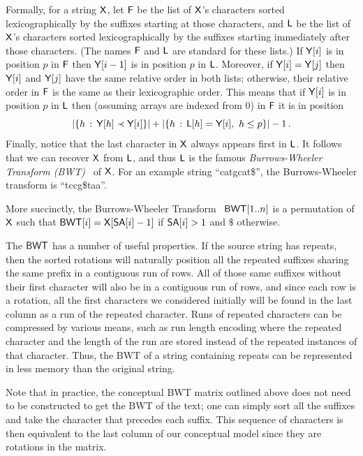 Formally, for a string $\mathsf{X}$, let $\mbox{\rm {\sf F}}$ be the list of $\mathsf{X}$'s characters sorted lexicographically by the suffixes starting at those characters, and $\mbox{\rm {\sf L}}$ be the list of $\mathsf{X}$'s characters sorted lexicographically by the suffixes starting immediately after those characters.  (The names $\mbox{\rm {\sf F}}$ and $\mbox{\rm {\sf L}}$ are standard for these lists.)  If \(\mathsf{Y} [i]\) is in position $p$ in $\mbox{\rm {\sf F}}$ then \(\mathsf{Y} [i - 1]\) is in position $p$ in $\mbox{\rm {\sf L}}$.  Moreover, if \(\mathsf{Y} [i] = \mathsf{Y} [j]\) then \(\mathsf{Y} [i]\) and \(\mathsf{Y} [j]\) have the same relative order in both lists; otherwise, their relative order in $\mbox{\rm {\sf F}}$ is the same as their lexicographic order.  This means that if \(\mathsf{Y} [i]\) is in position $p$ in $\mbox{\rm {\sf L}}$ then (assuming arrays are indexed from 0) in $\mbox{\rm {\sf F}}$ it is in position
\[|\{h\,:\,\mathsf{Y} [h] \prec \mathsf{Y}[i]\}| + |\{h\,:\, \mbox{\rm {\sf L}} [h] = \mathsf{Y} [i],\ h \leq p\}| - 1\,.\] Finally, notice that the last character in $\mathsf{X}$ always appears first in $\mbox{\rm {\sf L}}$.  It follows that we can recover $\mathsf{X}$ from $\mbox{\rm {\sf L}}$, and thus $\mbox{\rm {\sf L}}$ is the famous {\em Burrows-Wheeler Transform (BWT)}~\cite{bw1994} of $\mathsf{X}$.  For an example string ``catgcat\$'', the Burrows-Wheeler transform is ``tccg\$taa''.

More succinctly, the Burrows-Wheeler Transform~\cite{bw1994} $\mbox{\rm {\sf BWT}}[1..n]$ is a
permutation of $\mathsf{X}$ such that $\mbox{\rm {\sf BWT}}[i] = \mathsf{X}[\mbox{\rm {\sf SA}}[i]-1]$ if $\mbox{\rm {\sf SA}}[i]>1$
and $\$$ otherwise.



The $\mbox{\rm {\sf BWT}}$ has a number of useful properties.
If the source string has repeats, then the sorted rotations will naturally position all the repeated suffixes sharing the same prefix in a contiguous run of rows.
All of those same suffixes without their first character will also be in a contiguous run of rows, and since each row is a rotation, all the first characters we considered initially will be found in the last column as a run of the repeated character.
Runs of repeated characters can be compressed by various means, such as run length encoding where the repeated character and the length of the run are stored instead of the repeated instances of that character. Thus, the BWT  of a string containing repeats can be represented in less memory than the original string.

Note that in practice, the conceptual BWT matrix outlined above does not need to be constructed to get the BWT of the text; one can simply sort all the suffixes and take the character that precedes each suffix. This sequence of characters is then equivalent to the last column of our conceptual model since they are rotations in the matrix.

